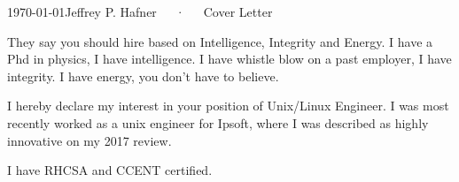 \documentclass[11pt, a4paper]{awesome-cv}
\begin{document}
\makecvheader[R]

\makecvfooter
  {\today}{Jeffrey P. Hafner~~~·~~~Cover Letter}{}

\makelettertitle

\begin{cvletter}

They say you should hire based on Intelligence, Integrity and Energy.
I have a Phd in physics, I have intelligence.
I have whistle blow on a past employer, I have integrity.
I have energy, you don't have to believe.

I hereby declare my interest in  your position of Unix/Linux Engineer.
I was most recently worked as a unix engineer for Ipsoft, where I was described as highly innovative on my 2017 review.

I have RHCSA and CCENT certified.










%

\end{cvletter}


\makeletterclosing

\end{document}
